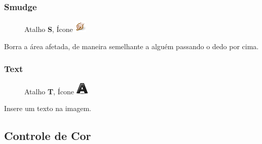 \documentclass[12pt,onecolumn]{article}
\begin{document}
    \subsubsection{Smudge}
      \begin{figure}[H]
        Atalho {\bf S}, Ícone
        \includegraphics{gimp-icons/stock-tool-smudge-22.png}
        \label{fig:smudge}
      \end{figure}
      Borra a área afetada, de maneira semelhante a alguém passando o dedo por cima.
      
    \subsubsection{Text}
      \begin{figure}[H]
        Atalho {\bf T}, Ícone
        \includegraphics{gimp-icons/stock-tool-text-22.png}
        \label{fig:text}
      \end{figure}
      Insere um texto na imagem.




  \subsection{Controle de Cor}
  \label{sec:color_control}
\end{document}
